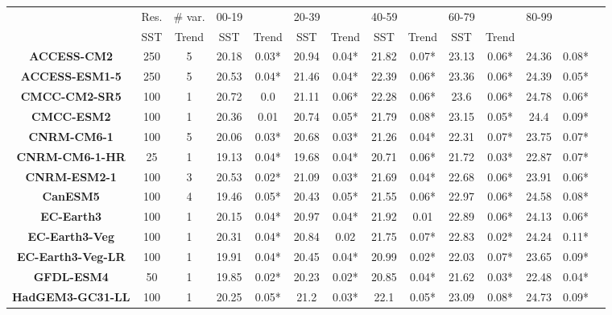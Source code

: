 \begin{tabular}{|c|c|c|c|c|c|c|c|c|c|c|c|c|c|}
\toprule
{} & Res. & \# var. & \multicolumn{2}{l}{00-19} & \multicolumn{2}{l}{20-39} & \multicolumn{2}{l}{40-59} & \multicolumn{2}{l}{60-79} & \multicolumn{2}{l}{80-99} \\
{} &    SST &  Trend &    SST &  Trend &    SST &  Trend &    SST &  Trend &    SST &  Trend \\
\midrule
\textbf{ACCESS-CM2      } &  250 &      5 &  20.18 &  0.03* &  20.94 &  0.04* &  21.82 &  0.07* &  23.13 &  0.06* &  24.36 &  0.08* \\
\textbf{ACCESS-ESM1-5   } &  250 &      5 &  20.53 &  0.04* &  21.46 &  0.04* &  22.39 &  0.06* &  23.36 &  0.06* &  24.39 &  0.05* \\
\textbf{CMCC-CM2-SR5    } &  100 &      1 &  20.72 &    0.0 &  21.11 &  0.06* &  22.28 &  0.06* &   23.6 &  0.06* &  24.78 &  0.06* \\
\textbf{CMCC-ESM2       } &  100 &      1 &  20.36 &   0.01 &  20.74 &  0.05* &  21.79 &  0.08* &  23.15 &  0.05* &   24.4 &  0.09* \\
\textbf{CNRM-CM6-1      } &  100 &      5 &  20.06 &  0.03* &  20.68 &  0.03* &  21.26 &  0.04* &  22.31 &  0.07* &  23.75 &  0.07* \\
\textbf{CNRM-CM6-1-HR   } &   25 &      1 &  19.13 &  0.04* &  19.68 &  0.04* &  20.71 &  0.06* &  21.72 &  0.03* &  22.87 &  0.07* \\
\textbf{CNRM-ESM2-1     } &  100 &      3 &  20.53 &  0.02* &  21.09 &  0.03* &  21.69 &  0.04* &  22.68 &  0.06* &  23.91 &  0.06* \\
\textbf{CanESM5         } &  100 &      4 &  19.46 &  0.05* &  20.43 &  0.05* &  21.55 &  0.06* &  22.97 &  0.06* &  24.58 &  0.08* \\
\textbf{EC-Earth3       } &  100 &      1 &  20.15 &  0.04* &  20.97 &  0.04* &  21.92 &   0.01 &  22.89 &  0.06* &  24.13 &  0.06* \\
\textbf{EC-Earth3-Veg   } &  100 &      1 &  20.31 &  0.04* &  20.84 &   0.02 &  21.75 &  0.07* &  22.83 &  0.02* &  24.24 &  0.11* \\
\textbf{EC-Earth3-Veg-LR} &  100 &      1 &  19.91 &  0.04* &  20.45 &  0.04* &  20.99 &  0.02* &  22.03 &  0.07* &  23.65 &  0.09* \\
\textbf{GFDL-ESM4       } &   50 &      1 &  19.85 &  0.02* &  20.23 &  0.02* &  20.85 &  0.04* &  21.62 &  0.03* &  22.48 &  0.04* \\
\textbf{HadGEM3-GC31-LL } &  100 &      1 &  20.25 &  0.05* &   21.2 &  0.03* &   22.1 &  0.05* &  23.09 &  0.08* &  24.73 &  0.09* \\

\end{tabular}
